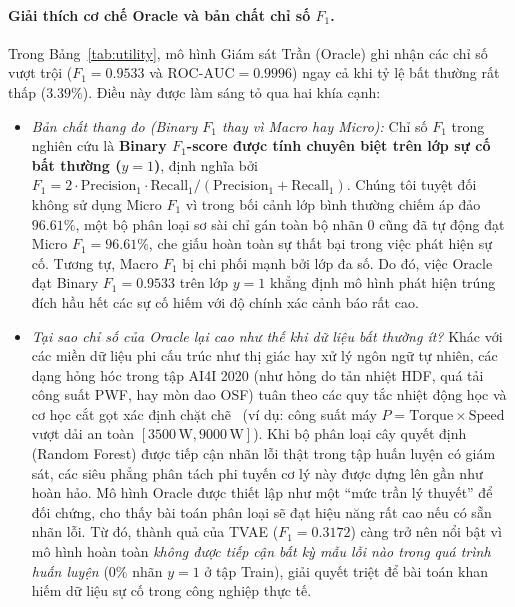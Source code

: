 \documentclass{article}
\begin{document}
\paragraph{Giải thích cơ chế Oracle và bản chất chỉ số $F_1$.} Trong Bảng~\ref{tab:utility}, mô hình Giám sát Trần (Oracle) ghi nhận các chỉ số vượt trội ($F_1 = 0.9533$ và $\text{ROC-AUC} = 0.9996$) ngay cả khi tỷ lệ bất thường rất thấp ($3.39\%$). Điều này được làm sáng tỏ qua hai khía cạnh:
\begin{itemize}
    \item \emph{Bản chất thang đo (Binary $F_1$ thay vì Macro hay Micro):} Chỉ số $F_1$ trong nghiên cứu là \textbf{Binary $F_1$-score được tính chuyên biệt trên lớp sự cố bất thường ($y=1$)}, định nghĩa bởi $F_1 = 2 \cdot \text{Precision}_1 \cdot \text{Recall}_1 / (\text{Precision}_1 + \text{Recall}_1)$. Chúng tôi tuyệt đối không sử dụng Micro $F_1$ vì trong bối cảnh lớp bình thường chiếm áp đảo $96.61\%$, một bộ phân loại sơ sài chỉ gán toàn bộ nhãn $0$ cũng đã tự động đạt Micro $F_1 = 96.61\%$, che giấu hoàn toàn sự thất bại trong việc phát hiện sự cố. Tương tự, Macro $F_1$ bị chi phối mạnh bởi lớp đa số. Do đó, việc Oracle đạt Binary $F_1 = 0.9533$ trên lớp $y=1$ khẳng định mô hình phát hiện trúng đích hầu hết các sự cố hiếm với độ chính xác cảnh báo rất cao.
    \item \emph{Tại sao chỉ số của Oracle lại cao như thế khi dữ liệu bất thường ít?} Khác với các miền dữ liệu phi cấu trúc như thị giác hay xử lý ngôn ngữ tự nhiên, các dạng hỏng hóc trong tập AI4I 2020 (như hỏng do tản nhiệt HDF, quá tải công suất PWF, hay mòn dao OSF) tuân theo các quy tắc nhiệt động học và cơ học cắt gọt xác định chặt chẽ~\citep{matzka2020explainable} (ví dụ: công suất máy $P = \text{Torque} \times \text{Speed}$ vượt dải an toàn $[3500\,\text{W}, 9000\,\text{W}]$). Khi bộ phân loại cây quyết định (Random Forest) được tiếp cận nhãn lỗi thật trong tập huấn luyện có giám sát, các siêu phẳng phân tách phi tuyến cơ lý này được dựng lên gần như hoàn hảo. Mô hình Oracle được thiết lập như một ``mức trần lý thuyết'' để đối chứng, cho thấy bài toán phân loại sẽ đạt hiệu năng rất cao nếu có sẵn nhãn lỗi. Từ đó, thành quả của TVAE ($F_1 = 0.3172$) càng trở nên nổi bật vì mô hình hoàn toàn \emph{không được tiếp cận bất kỳ mẫu lỗi nào trong quá trình huấn luyện} ($0\%$ nhãn $y=1$ ở tập Train), giải quyết triệt để bài toán khan hiếm dữ liệu sự cố trong công nghiệp thực tế.
\end{itemize}
\end{document}
